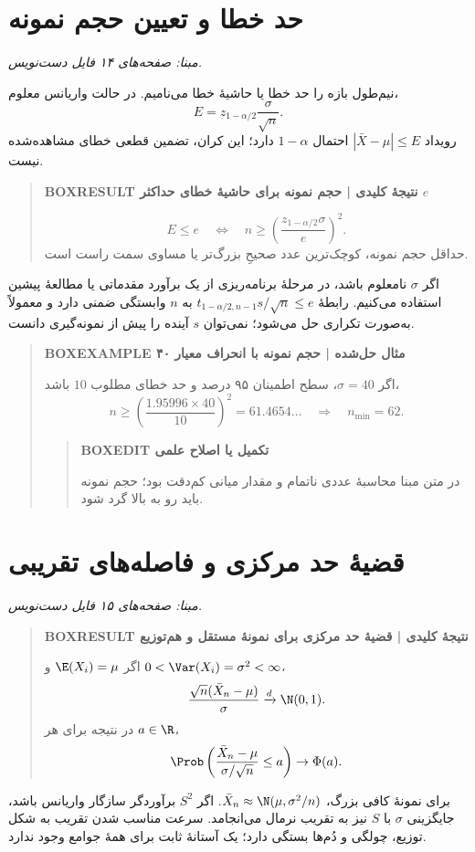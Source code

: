 \section{حد خطا و تعیین حجم نمونه}
\textit{مبنا: صفحه‌های ۱۴ فایل دست‌نویس.}\par 
نیم‌طول بازه را حد خطا یا حاشیهٔ خطا می‌نامیم. در حالت واریانس معلوم،
\[E=z_{1-\alpha/2}\frac\sigma{\sqrt n}.\]
رویداد $|\bar X-\mu|\le E$ احتمال $1-\alpha$ دارد؛ این کران، تضمین قطعی خطای مشاهده‌شده نیست.
\begin{quote}\textbf{BOXRESULT نتیجهٔ کلیدی | حجم نمونه برای حاشیهٔ خطای حداکثر $e$}\par 
\[
E\le e\quad\Longleftrightarrow\quad
n\ge\left(\frac{z_{1-\alpha/2}\sigma}{e}\right)^2.
\]
حداقل حجم نمونه، کوچک‌ترین عدد صحیحِ بزرگ‌تر یا مساوی سمت راست است.
\end{quote}
اگر $\sigma$ نامعلوم باشد، در مرحلهٔ برنامه‌ریزی از یک برآورد مقدماتی یا مطالعهٔ پیشین استفاده می‌کنیم. رابطهٔ $t_{1-\alpha/2,n-1}s/\sqrt n\le e$ به $n$ وابستگی ضمنی دارد و معمولاً به‌صورت تکراری حل می‌شود؛ نمی‌توان $s$ آینده را پیش از نمونه‌گیری دانست.
\begin{quote}\textbf{BOXEXAMPLE مثال حل‌شده | حجم نمونه با انحراف معیار ۴۰}\par 
اگر $\sigma=40$، سطح اطمینان ۹۵ درصد و حد خطای مطلوب $10$ باشد،
\[
n\ge\left(\frac{1.95996\times40}{10}\right)^2=61.4654\ldots
\quad\Longrightarrow\quad\boxed{n_{\min}=62}.
\]
\begin{quote}\textbf{BOXEDIT تکمیل یا اصلاح علمی}\par در متن مبنا محاسبهٔ عددی ناتمام و مقدار میانی کم‌دقت بود؛ حجم نمونه باید رو به بالا گرد شود.\end{quote}
\end{quote}
\section{قضیهٔ حد مرکزی و فاصله‌های تقریبی}
\textit{مبنا: صفحه‌های ۱۵ فایل دست‌نویس.}\par 
\begin{quote}\textbf{BOXRESULT نتیجهٔ کلیدی | قضیهٔ حد مرکزی برای نمونهٔ مستقل و هم‌توزیع}\par 
اگر $\E(X_i)=\mu$ و $0<\Var(X_i)=\sigma^2<\infty$،
\[
\frac{\sqrt n(\bar X_n-\mu)}\sigma\xrightarrow{d}\N(0,1).
\]
در نتیجه برای هر $a\in\R$،
\[
\Prob\left(\frac{\bar X_n-\mu}{\sigma/\sqrt n}\le a\right)\to\Phi(a).
\]
\end{quote}
برای نمونهٔ کافی بزرگ، $\bar X_n\approx\N(\mu,\sigma^2/n)$. اگر $S^2$ برآوردگر سازگار واریانس باشد، جایگزینی $\sigma$ با $S$ نیز به تقریب نرمال می‌انجامد. سرعت مناسب شدن تقریب به شکل توزیع، چولگی و دُم‌ها بستگی دارد؛ یک آستانهٔ ثابت برای همهٔ جوامع وجود ندارد.
